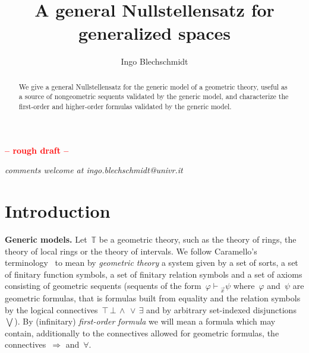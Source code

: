 \documentclass[oneside,reqno]{amsart}
\title{A general Nullstellensatz for generalized spaces}
\author{Ingo Blechschmidt}
\theoremstyle{definition}
\theoremstyle{plain}
\theoremstyle{remark}
\newcommand{\TT}{\mathbb{T}}
\renewcommand{\_}{\mathpunct{.}\,}
\newcommand{\?}{\,{:}\,}
\renewcommand{\paragraph}[1]{\noindent\textbf{#1.}}
\newcommand{\seq}[1]{\mathrel{\vdash\!\!\!_{#1}}}
\begin{document}
\begin{abstract}
  We give a general Nullstellensatz for the generic model of a
  geometric theory, useful as a source of nongeometric sequents validated by
  the generic model, and characterize the first-order and higher-order formulas validated by the
  generic model.
\end{abstract}

\maketitle
\thispagestyle{empty}

\begin{center}
  \textcolor{red}{\textbf{-- rough draft --}}

  \emph{comments welcome at ingo.blechschmidt@univr.it}
\end{center}

\section{Introduction}
\label{sect:introduction}

\paragraph{Generic models} Let~$\TT$ be a geometric theory, such as the theory
of rings, the theory of local rings or the theory of intervals. We follow Caramello's
terminology~\cite{caramello:tst} to mean by \emph{geometric theory} a system
given by a set of sorts, a set of finitary function symbols, a set of finitary
relation symbols and a set of axioms consisting of geometric sequents
(sequents of the form~$\varphi \seq{\vec x} \psi$ where~$\varphi$ and~$\psi$
are geometric formulas, that is formulas built from equality and the relation
symbols by the logical connectives~${\top}\,{\bot}\,{\wedge}\,{\vee}\,{\exists}$
and by arbitrary set-indexed disjunctions~$\bigvee$). By (infinitary) \emph{first-order
formula} we will mean a formula which may contain, additionally to the
connectives allowed for geometric formulas, the connectives~${\Rightarrow}$
and~${\forall}$.
\end{document}
